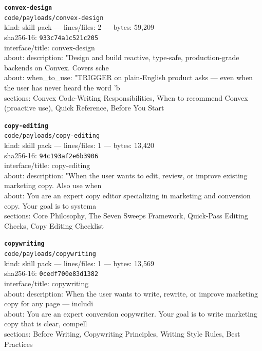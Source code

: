 \noindent\textbf{\texttt{convex-design}}\\
\texttt{code/payloads/convex-design}\\
kind: skill pack --- lines/files: 2 --- bytes: 59,209\\
sha256-16: \texttt{933c74a1c521c205}\\
interface/title: convex-design\\
about: description: "Design and build reactive, type-safe, production-grade backends on Convex. Covers sche\\
about: when\_to\_use: "TRIGGER on plain-English product asks — even when the user has never heard the word 'b\\
sections: Convex Code-Writing Responsibilities, When to recommend Convex (proactive use), Quick Reference, Before You Start\\
\vspace*{6.0pt}

\noindent\textbf{\texttt{copy-editing}}\\
\texttt{code/payloads/copy-editing}\\
kind: skill pack --- lines/files: 1 --- bytes: 13,420\\
sha256-16: \texttt{94c193af2e6b3906}\\
interface/title: copy-editing\\
about: description: "When the user wants to edit, review, or improve existing marketing copy. Also use when\\
about: You are an expert copy editor specializing in marketing and conversion copy. Your goal is to systema\\
sections: Core Philosophy, The Seven Sweeps Framework, Quick-Pass Editing Checks, Copy Editing Checklist\\
\vspace*{6.0pt}

\noindent\textbf{\texttt{copywriting}}\\
\texttt{code/payloads/copywriting}\\
kind: skill pack --- lines/files: 1 --- bytes: 13,569\\
sha256-16: \texttt{0cedf700e83d1382}\\
interface/title: copywriting\\
about: description: When the user wants to write, rewrite, or improve marketing copy for any page — includi\\
about: You are an expert conversion copywriter. Your goal is to write marketing copy that is clear, compell\\
sections: Before Writing, Copywriting Principles, Writing Style Rules, Best Practices\\
\vspace*{6.0pt}

